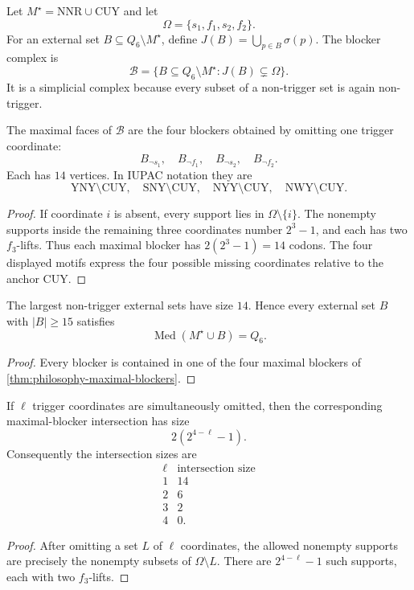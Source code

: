 \begin{definition}
\label{def:philosophy-blocker-complex}
Let $M^{\star}=\mathrm{NNR}\cup\mathrm{CUY}$ and let
$$
  \Omega=\{s_{1},f_{1},s_{2},f_{2}\}.
$$
For an external set $B\subseteq Q_{6}\setminus M^{\star}$, define
$J(B)=\bigcup_{p\in B}\sigma(p)$. The blocker complex is
$$
  \mathcal{B}
  =
  \{B\subseteq Q_{6}\setminus M^{\star}:J(B)\subsetneq\Omega\}.
$$
It is a simplicial complex because every subset of a non-trigger set is
again non-trigger.
\end{definition}

\begin{theorem}
\label{thm:philosophy-maximal-blockers}
The maximal faces of $\mathcal{B}$ are the four blockers obtained by
omitting one trigger coordinate:
$$
  B_{\neg s_{1}},\quad
  B_{\neg f_{1}},\quad
  B_{\neg s_{2}},\quad
  B_{\neg f_{2}}.
$$
Each has $14$ vertices. In IUPAC notation they are
$$
  \mathrm{YNY}\setminus\mathrm{CUY},\quad
  \mathrm{SNY}\setminus\mathrm{CUY},\quad
  \mathrm{NYY}\setminus\mathrm{CUY},\quad
  \mathrm{NWY}\setminus\mathrm{CUY}.
$$
\end{theorem}
\begin{proof}
If coordinate $i$ is absent, every support lies in
$\Omega\setminus\{i\}$. The nonempty supports inside the remaining
three coordinates number $2^{3}-1$, and each has two $f_{3}$-lifts.
Thus each maximal blocker has $2(2^{3}-1)=14$ codons. The four displayed
motifs express the four possible missing coordinates relative to the
anchor $\mathrm{CUY}$.
\end{proof}

\begin{corollary}
\label{cor:philosophy-blocker-forcing-threshold}
The largest non-trigger external sets have size $14$. Hence every
external set $B$ with $|B|\geq 15$ satisfies
$$
  \operatorname{Med}(M^{\star}\cup B)=Q_{6}.
$$
\end{corollary}
\begin{proof}
Every blocker is contained in one of the four maximal blockers of
\autoref{thm:philosophy-maximal-blockers}.
\end{proof}

\begin{theorem}
\label{thm:philosophy-blocker-intersections}
If $\ell$ trigger coordinates are simultaneously omitted, then the
corresponding maximal-blocker intersection has size
$$
  2(2^{4-\ell}-1).
$$
Consequently the intersection sizes are
$$
\begin{array}{c|r}
  \ell & \text{intersection size}\\
  \hline
  1 & 14\\
  2 & 6\\
  3 & 2\\
  4 & 0.
\end{array}
$$
\end{theorem}
\begin{proof}
After omitting a set $L$ of $\ell$ coordinates, the allowed nonempty
supports are precisely the nonempty subsets of $\Omega\setminus L$.
There are $2^{4-\ell}-1$ such supports, each with two $f_{3}$-lifts.
\end{proof}

